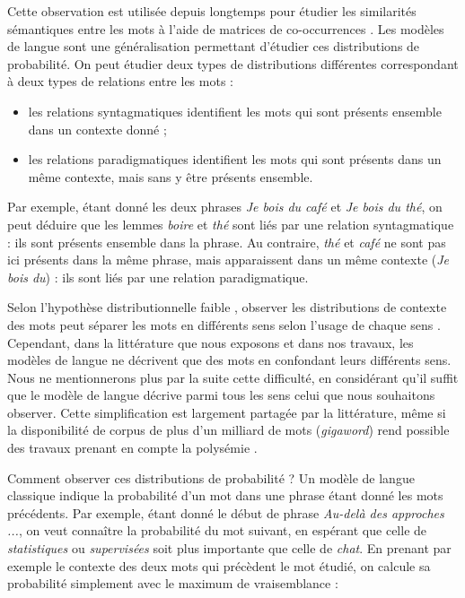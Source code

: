Cette observation est utilisée depuis longtemps pour étudier les similarités
sémantiques entre les mots à l'aide de matrices de co-occurrences
\citep{miller1967empirical}. Les modèles de langue sont une généralisation
permettant d'étudier ces distributions de probabilité. On peut étudier deux
types de distributions différentes correspondant à deux types de relations
entre les mots \citep{sahlgren2008distributional} :

\begin{itemize}
    \item les relations syntagmatiques identifient les mots qui sont présents
        ensemble dans un contexte donné ;
    \item les relations paradigmatiques identifient les mots qui sont présents
        dans un même contexte, mais sans y être présents ensemble.
\end{itemize}

Par exemple, étant donné les deux phrases \textit{Je bois du café} et \textit{Je
bois du thé}, on peut déduire que les lemmes \textit{boire} et \textit{thé} sont
liés par une relation syntagmatique : ils sont présents ensemble dans la
phrase. Au contraire, \textit{thé} et \textit{café} ne sont pas ici présents dans
la même phrase, mais apparaissent dans un même contexte (\textit{Je bois du}) :
ils sont liés par une relation paradigmatique.

Selon l'hypothèse distributionnelle faible \citep{lenci2008distributional},
observer les distributions de contexte des mots peut séparer les mots en
différents sens selon l'usage de chaque sens
\citep{yarowsky1993one,pantel2002discovering,pedersen2010duluth}. Cependant,
dans la littérature que nous exposons et dans nos travaux, les modèles de
langue ne décrivent que des mots en confondant leurs différents sens. Nous ne
mentionnerons plus par la suite cette difficulté, en considérant qu'il suffit
que le modèle de langue décrive parmi tous les sens celui que nous souhaitons
observer. Cette simplification est largement partagée par la littérature, même
si la disponibilité de corpus de plus d'un milliard de mots (\textit{gigaword})
rend possible des travaux prenant en compte la polysémie
\citep{kawahara2014step}.

Comment observer ces distributions de probabilité ? Un modèle de langue
classique indique la probabilité d'un mot dans une phrase étant donné les mots
précédents. Par exemple, étant donné le début de phrase \textit{Au-delà des
approches ...}, on veut connaître la probabilité du mot suivant, en espérant
que celle de \textit{statistiques} ou \textit{supervisées} soit plus importante que
celle de \textit{chat}. En prenant par exemple le contexte des deux mots qui
précèdent le mot étudié, on calcule sa probabilité simplement avec le maximum
de vraisemblance :

